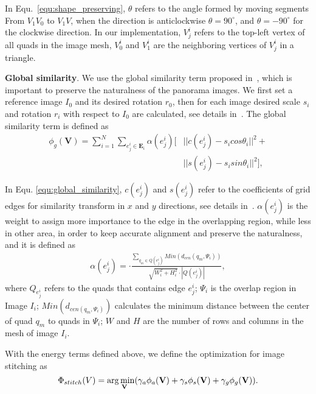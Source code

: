 \documentclass[10pt,journal,compsoc]{IEEEtran}
\begin{document}
In Equ.~\ref{equ:shape_preserving}, $\theta$ refers to the angle formed by moving segments From $V_1V_0$ to $V_1V$, when the direction is anticlockwise $\theta=90^{\circ}$, and $\theta=-90^{\circ}$ for the clockwise direction. In our implementation, $V_j^i$ refers to the top-left vertex of all quads in the image mesh, $V_0^i$ and $V_1^i$ are the neighboring vertices of $V_j^i$ in a triangle.

\textbf{Global similarity}.
We use the global similarity term proposed in~\cite{conf/eccv/ChenC16}, which is important to preserve the naturalness of the panorama images.
We first set a reference image $I_0$ and its desired rotation $r_0$,  then for each image desired scale $s_i$ and rotation $r_i$ with respect to $I_0$ are calculated, see details in~\cite{conf/eccv/ChenC16}. The global similarity term is defined as
\begin{equation} \label{equ:global_similarity}
\begin{split}
    \phi_g(\mathbf{V}) = \sum\limits_{i=1}^N\sum\limits_{e^i_j \in \mathbf{E}_i} \alpha(e^i_j)[&|| c(e^i_j)-s_i cos\theta_i ||^2+\\
    &|| s(e^i_j)-s_i sin\theta_i ||^2],
\end{split}
\end{equation}

In Equ. \ref{equ:global_similarity}, $c(e^i_j)$ and $s(e^i_j)$ refer to the coefficients of  grid edges for similarity transform in $x$ and $y$ directions, see details in~\cite{journals/jgtools/IgarashiI09}. $\alpha(e^i_j)$ is the weight to assign more importance to the edge in the overlapping region, while less in other area, in order to keep accurate alignment and preserve the naturalness, and it is defined as
\begin{equation} \label{equ:global_weight}
\begin{split}
    \alpha(e^i_j)= \cdot \frac{\sum\limits_{q_m\in Q(e^i_j)}Min(d_{cen}(q_m, \Psi_i))}{\sqrt {W_i^2+H_i^2}\cdot |Q(e^i_j)|},
\end{split}
\end{equation}
where $Q_{e^i_j}$ refers to the quads that contains edge $e^i_j$;
$\Psi_i$ is the overlap region in Image $I_i$;
$Min(d_{cen(q_m, \Psi_i)})$ calculates the minimum distance between the center of quad $q_m$ to quads in $\Psi_i$;
$W$ and $H$ are the number of rows and columns in the mesh of image $I_i$.

With the energy terms defined above, we define the optimization for image stitching as
\begin{equation} \label{equ:global_stitching}
 \Phi_{stitch}(V)=\arg \min_{\hspace{-0.10in}\textbf{V}}(\gamma_a \phi_a(\textbf{V})+\gamma_s \phi_s(\textbf{V})+\gamma_g \phi_g(\textbf{V})).
\end{equation}
\end{document}
